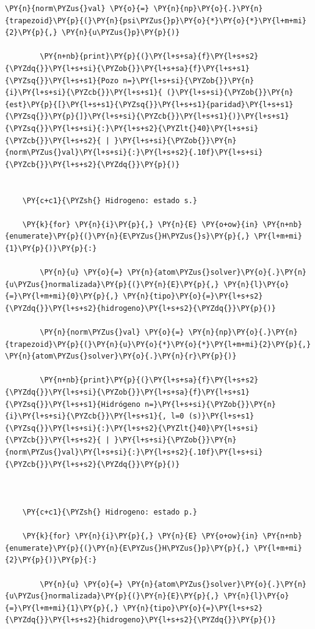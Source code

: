 \documentclass[11pt]{article}
\makeatletter
\def\PY@reset{\let\PY@it=\relax \let\PY@bf=\relax \let\PY@ul=\relax \let\PY@tc=\relax \let\PY@bc=\relax \let\PY@ff=\relax}
\def\PY@tok#1{\csname PY@tok@#1\endcsname}
\def\PY@toks#1+{\ifx\relax#1\empty\else \PY@tok{#1}\expandafter\PY@toks\fi}
\def\PY@do#1{\PY@bc{\PY@tc{\PY@ul{\PY@it{\PY@bf{\PY@ff{#1}}}}}}}
\def\PY#1#2{\PY@reset\PY@toks#1+\relax+\PY@do{#2}}
\makeatother
\begin{document}
\begin{tcolorbox}[breakable, size=fbox, boxrule=1pt, pad at break*=1mm,colback=cellbackground, colframe=cellborder]
\begin{Verbatim}[commandchars=\\\{\}]
        \PY{n}{norm\PYZus{}val} \PY{o}{=} \PY{n}{np}\PY{o}{.}\PY{n}{trapezoid}\PY{p}{(}\PY{n}{psi\PYZus{}p}\PY{o}{*}\PY{o}{*}\PY{l+m+mi}{2}\PY{p}{,} \PY{n}{u\PYZus{}p}\PY{p}{)}

        \PY{n+nb}{print}\PY{p}{(}\PY{l+s+sa}{f}\PY{l+s+s2}{\PYZdq{}}\PY{l+s+si}{\PYZob{}}\PY{l+s+sa}{f}\PY{l+s+s1}{\PYZsq{}}\PY{l+s+s1}{Pozo n=}\PY{l+s+si}{\PYZob{}}\PY{n}{i}\PY{l+s+si}{\PYZcb{}}\PY{l+s+s1}{ (}\PY{l+s+si}{\PYZob{}}\PY{n}{est}\PY{p}{[}\PY{l+s+s1}{\PYZsq{}}\PY{l+s+s1}{paridad}\PY{l+s+s1}{\PYZsq{}}\PY{p}{]}\PY{l+s+si}{\PYZcb{}}\PY{l+s+s1}{)}\PY{l+s+s1}{\PYZsq{}}\PY{l+s+si}{:}\PY{l+s+s2}{\PYZlt{}40}\PY{l+s+si}{\PYZcb{}}\PY{l+s+s2}{ | }\PY{l+s+si}{\PYZob{}}\PY{n}{norm\PYZus{}val}\PY{l+s+si}{:}\PY{l+s+s2}{.10f}\PY{l+s+si}{\PYZcb{}}\PY{l+s+s2}{\PYZdq{}}\PY{p}{)}


    \PY{c+c1}{\PYZsh{} Hidrogeno: estado s.}

    \PY{k}{for} \PY{n}{i}\PY{p}{,} \PY{n}{E} \PY{o+ow}{in} \PY{n+nb}{enumerate}\PY{p}{(}\PY{n}{E\PYZus{}H\PYZus{}s}\PY{p}{,} \PY{l+m+mi}{1}\PY{p}{)}\PY{p}{:}

        \PY{n}{u} \PY{o}{=} \PY{n}{atom\PYZus{}solver}\PY{o}{.}\PY{n}{u\PYZus{}normalizada}\PY{p}{(}\PY{n}{E}\PY{p}{,} \PY{n}{l}\PY{o}{=}\PY{l+m+mi}{0}\PY{p}{,} \PY{n}{tipo}\PY{o}{=}\PY{l+s+s2}{\PYZdq{}}\PY{l+s+s2}{hidrogeno}\PY{l+s+s2}{\PYZdq{}}\PY{p}{)}

        \PY{n}{norm\PYZus{}val} \PY{o}{=} \PY{n}{np}\PY{o}{.}\PY{n}{trapezoid}\PY{p}{(}\PY{n}{u}\PY{o}{*}\PY{o}{*}\PY{l+m+mi}{2}\PY{p}{,} \PY{n}{atom\PYZus{}solver}\PY{o}{.}\PY{n}{r}\PY{p}{)}

        \PY{n+nb}{print}\PY{p}{(}\PY{l+s+sa}{f}\PY{l+s+s2}{\PYZdq{}}\PY{l+s+si}{\PYZob{}}\PY{l+s+sa}{f}\PY{l+s+s1}{\PYZsq{}}\PY{l+s+s1}{Hidrógeno n=}\PY{l+s+si}{\PYZob{}}\PY{n}{i}\PY{l+s+si}{\PYZcb{}}\PY{l+s+s1}{, l=0 (s)}\PY{l+s+s1}{\PYZsq{}}\PY{l+s+si}{:}\PY{l+s+s2}{\PYZlt{}40}\PY{l+s+si}{\PYZcb{}}\PY{l+s+s2}{ | }\PY{l+s+si}{\PYZob{}}\PY{n}{norm\PYZus{}val}\PY{l+s+si}{:}\PY{l+s+s2}{.10f}\PY{l+s+si}{\PYZcb{}}\PY{l+s+s2}{\PYZdq{}}\PY{p}{)}

    

    \PY{c+c1}{\PYZsh{} Hidrogeno: estado p.}

    \PY{k}{for} \PY{n}{i}\PY{p}{,} \PY{n}{E} \PY{o+ow}{in} \PY{n+nb}{enumerate}\PY{p}{(}\PY{n}{E\PYZus{}H\PYZus{}p}\PY{p}{,} \PY{l+m+mi}{2}\PY{p}{)}\PY{p}{:}

        \PY{n}{u} \PY{o}{=} \PY{n}{atom\PYZus{}solver}\PY{o}{.}\PY{n}{u\PYZus{}normalizada}\PY{p}{(}\PY{n}{E}\PY{p}{,} \PY{n}{l}\PY{o}{=}\PY{l+m+mi}{1}\PY{p}{,} \PY{n}{tipo}\PY{o}{=}\PY{l+s+s2}{\PYZdq{}}\PY{l+s+s2}{hidrogeno}\PY{l+s+s2}{\PYZdq{}}\PY{p}{)}


\end{Verbatim}
\end{tcolorbox}
\end{document}
